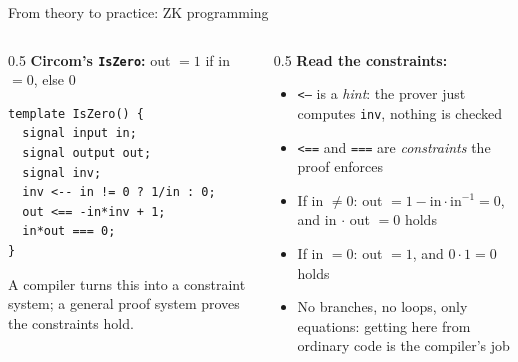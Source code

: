 \ifdefined\PRESENTATION\else\PassOptionsToClass{handout}{beamer}\fi\documentclass[aspectratio=169, lualatex]{beamer}
\begin{document}
\begin{frame}[fragile]{From theory to practice: ZK programming}
	\begin{columns}[c]
		\begin{column}{0.5\textwidth}
			\textbf{Circom's \texttt{IsZero}:} out $= 1$ if in $= 0$, else $0$
			{\small
				\begin{verbatim}
template IsZero() {
  signal input in;
  signal output out;
  signal inv;
  inv <-- in != 0 ? 1/in : 0;
  out <== -in*inv + 1;
  in*out === 0;
}
\end{verbatim}
			}
			A compiler turns this into a constraint system; a general proof system proves the constraints hold.
		\end{column}
		\begin{column}{0.5\textwidth}
			\textbf{Read the constraints:}
			\begin{itemize}
				\item \texttt{<--} is a \textit{hint}: the prover just computes \texttt{inv}, nothing is checked
				\item \texttt{<==} and \texttt{===} are \textit{constraints} the proof enforces
				\item If in $\neq 0$: out $= 1 - \text{in} \cdot \text{in}^{-1} = 0$, and in $\cdot$ out $= 0$ holds
				\item If in $= 0$: out $= 1$, and $0 \cdot 1 = 0$ holds
				\item No branches, no loops, only equations: getting here from ordinary code is the compiler's job
			\end{itemize}
		\end{column}
	\end{columns}
\end{frame}
\end{document}

